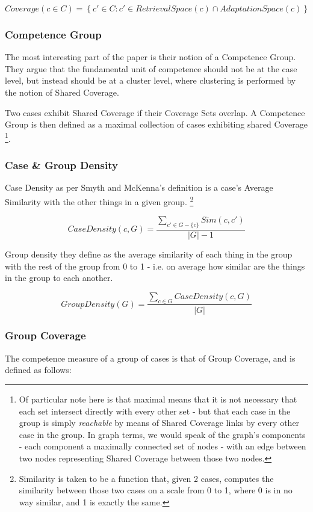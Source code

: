 \documentclass[a4paper,11pt]{report}
\begin{document}
\[ Coverage(c \in C) = \left\{ c' \in C : c' \in RetrievalSpace(c) \cap AdaptationSpace(c) \right\} \]


\subsubsection{Competence Group}
The most interesting part of the paper is their notion of a Competence Group. They argue that the fundamental unit of competence should not be at the case level, but instead should be at a cluster level, where clustering is performed by the notion of Shared Coverage.

Two cases exhibit Shared Coverage if their Coverage Sets overlap. A Competence Group is then defined as a maximal  collection  of  cases  exhibiting  shared Coverage \footnote{Of particular note here is that maximal means that it is not necessary that each set intersect directly with every other set - but that each case in the group is simply \emph{reachable} by means of Shared Coverage links by every other case in the group. In graph terms, we would speak of the graph's components - each component a maximally connected set of nodes - with an edge between two nodes representing Shared Coverage between those two nodes.}.

\subsubsection{Case \& Group Density}

Case Density as per Smyth and McKenna's definition is a case's Average Similarity with the other things in a given group. \footnote{Similarity is taken to be a function that, given 2 cases, computes the similarity between those two cases on a scale from 0 to 1, where 0 is in no way similar, and 1 is exactly the same.}

\[
CaseDensity(c,G)=\frac{\underset{c'\in G-\{c\}}{\sum}Sim(c,c')}{\left|G\right|-1}
\]

Group density they define as the average similarity of each thing in the group with the rest of the group from 0 to 1 - i.e. on average how similar are the things in the group to each another.

\[
GroupDensity(G)=\frac{\underset{c\in G}{\sum}CaseDensity(c,G)}{\left|G\right|}
\]

\subsubsection{Group Coverage}
The competence measure of a group of cases is that of Group Coverage, and is defined as follows:
\end{document}
